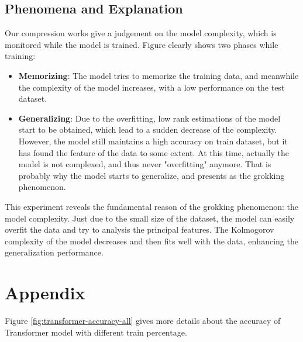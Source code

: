 \documentclass{article}
\begin{document}
\subsection{Phenomena and Explanation}

Our compression works give a judgement on the model complexity, which is monitored while the model is trained. Figure {} clearly shows two phases while training:
\begin{itemize}
    \item \textbf{Memorizing}: The model tries to memorize the training data, and meanwhile the complexity of the model increases, with a low performance on the test dataset.
    \item \textbf{Generalizing}: Due to the overfitting, low rank estimations of the model start to be obtained, which lead to a sudden decrease of the complexity. However, the model still maintains a high accuracy on train dataset, but it has found the feature of the data to some extent. At this time, actually the model is not complexed, and thus never "overfitting" anymore. That is probably why the model starts to generalize, and presents as the grokking phenomenon.
\end{itemize}

This experiment reveals the fundamental reason of the grokking phenomenon: the model complexity. Just due to the small size of the dataset, the model can easily overfit the data and try to analysis the principal features. The Kolmogorov complexity of the model decreases and then fits well with the data, enhancing the generalization performance.

\appendix

\section{Appendix}

Figure \ref{fig:transformer-accuracy-all} gives more details about the accuracy of Transformer model with different train percentage.
\end{document}
